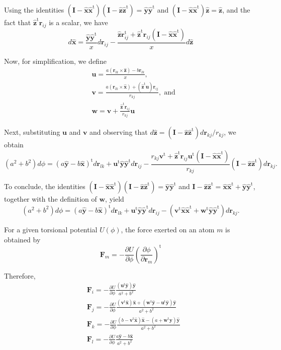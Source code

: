 \documentclass[11pt]{article}
\newcommand{\mt}[1]{\boldsymbol{\mathbf{#1}}}           %
\newcommand{\vt}[1]{\boldsymbol{\mathbf{#1}}}           %
\newcommand{\tr}[1]{#1^\text{t}}                        %
\newcommand{\diff}[2]{\frac{\partial #1}{\partial #2}}  %
\begin{document}
Using the identities $(\mt I - \hat{\vt x}\tr{\hat{\vt x}})(\mt I - \hat{\vt z}\tr{\hat{\vt z}}) = \hat{\vt y}\tr{\hat{\vt y}}$ and $(\mt I - \hat{\vt x}\tr{\hat{\vt x}})\hat{\vt z} = \hat{\vt z}$, and the fact that $\tr{\hat{\vt z}} {\vt r}_{ij}$ is a scalar, we have
\[
d\hat{\vt x} = \frac{\hat{\vt y}\tr{\hat{\vt y}}}{x}d{\vt r}_{ij} - \frac{\hat{\vt z}\tr{{\vt r}_{ij}} + \tr{\hat{\vt z}} {\vt r}_{ij} (\mt I - \hat{\vt x}\tr{\hat{\vt x}}) }{x}d\hat{\vt z}
\]

Now, for simplification, we define
\begin{subequations}
\begin{align}
&\vt u = \frac{a ({\vt r}_{lk} \times \hat{\vt z}) - b {\vt r}_{lk}}{x}, \\
&\vt v = \frac{a ({\vt r}_{lk} \times \hat{\vt x}) + (\tr{\hat{\vt z}}\vt u) {\vt r}_{ij}}{r_{kj}}, \; \text{and} \\
&\vt w = {\vt v} + \frac{\tr{\hat{\vt z}}{\vt r}_{ij}}{r_{kj}} {\vt u}
\end{align}
\end{subequations}

Next, substituting $\vt u$ and $\vt v$ and observing that $d\hat{\vt z} = (\mt I - \hat{\vt z}\tr{\hat{\vt z}}) d{\vt r}_{kj}/r_{kj}$, we obtain
\[
(a^2 + b^2)d\phi = \tr{\left(a\hat{\vt y} - b\hat{\vt x}\right)}d{\vt r}_{lk}
+ \tr{\vt u}\hat{\vt y}\tr{\hat{\vt y}}d{\vt r}_{ij} - \frac{ r_{kj} \tr{\vt v} + \tr{\hat{\vt z}} {\vt r}_{ij} \tr{\vt u}(\mt I - \hat{\vt x}\tr{\hat{\vt x}}) }{r_{kj}} (\mt I - \hat{\vt z}\tr{\hat{\vt z}}) d{\vt r}_{kj}.
\]

To conclude, the identities $(\mt I - \hat{\vt x}\tr{\hat{\vt x}})(\mt I - \hat{\vt z}\tr{\hat{\vt z}}) = \hat{\vt y}\tr{\hat{\vt y}}$ and $\mt I - \hat{\vt z}\tr{\hat{\vt z}} = \hat{\vt x}\tr{\hat{\vt x}} + \hat{\vt y}\tr{\hat{\vt y}}$, together with the definition of $\vt w$, yield
\[
(a^2 + b^2)d\phi = \tr{\left(a\hat{\vt y} - b\hat{\vt x}\right)}d{\vt r}_{lk}
+ \tr{\vt u}\hat{\vt y}\tr{\hat{\vt y}}d{\vt r}_{ij} - (\tr{\vt v}\hat{\vt x}\tr{\hat{\vt x}} + \tr{\vt w}\hat{\vt y}\tr{\hat{\vt y}}) d{\vt r}_{kj}.
\]

For a given torsional potential $U(\phi)$, the force exerted on an atom $m$ is obtained by
\[
\vt{F}_m = -\diff{U}{\phi} \tr{ \left( \diff{\phi}{\vt{r}_m} \right) }
\]

Therefore,
\begin{subequations}
\begin{align}
&\vt{F}_i = -\diff{U}{\phi} \frac{(\tr{\vt u}\hat{\vt y})\hat{\vt y}}{a^2 + b^2} \\
&\vt{F}_j = -\diff{U}{\phi} \frac{ (\tr{\vt v}\hat{\vt x})\hat{\vt x} + (\tr{\vt w}\hat{\vt y} - \tr{\vt u}\hat{\vt y}) \hat{\vt y}}{a^2 + b^2} \\
&\vt{F}_k = -\diff{U}{\phi} \frac{ (b - \tr{\vt v}\hat{\vt x})\hat{\vt x} - (a + \tr{\vt w}\hat{\vt y}) \hat{\vt y}}{a^2 + b^2} \\
&\vt{F}_l = -\diff{U}{\phi} \frac{a\hat{\vt y} - b\hat{\vt x}}{a^2 + b^2}
\end{align}
\end{subequations}
\end{document}
